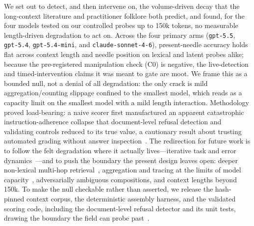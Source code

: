 \documentclass[11pt]{article}
\begin{document}
We set out to detect, and then intervene on, the volume-driven decay that the long-context literature and practitioner folklore both predict, and found, for the four models tested on our controlled probes up to 150k tokens, no measurable length-driven degradation to act on. Across the four primary arms (\texttt{gpt-5.5}, \texttt{gpt-5.4},
\texttt{gpt-5.4-mini}, and \texttt{claude-sonnet-4-6}), present-needle accuracy holds
flat across context length and needle position on lexical and latent probes alike;
because the pre-registered manipulation check (C0) is negative, the live-detection
and timed-intervention claims it was meant to gate are moot. We frame this as a
bounded null, not a denial of all degradation: the only crack is mild
aggregation/counting slippage confined to the smallest model, which reads as a
capacity limit on the smallest model with a mild length interaction. Methodology proved load-bearing: a naive
scorer first manufactured an apparent catastrophic instruction-adherence collapse
that document-level refusal detection and validating controls reduced to its true
value, a cautionary result about trusting automated grading without answer
inspection~\cite{zheng2023judge}. The redirection for future work is to follow the
felt degradation where it actually lives---iterative task and error
dynamics~\cite{orlanski2026slopcodebench, deng2026evoclaw}---and to push the
boundary the present design leaves open: deeper non-lexical multi-hop
retrieval~\cite{modarressi2025nolima}, aggregation and tracing at the limits of model
capacity~\cite{hsieh2024ruler}, adversarially ambiguous compositions, and context
lengths beyond 150k. To make the null checkable rather than asserted, we release the
hash-pinned context corpus, the deterministic assembly harness, and the validated
scoring code, including the document-level refusal detector and its unit tests, drawing
the boundary the field can probe past~\cite{adnan2025ddi}.



\end{document}
